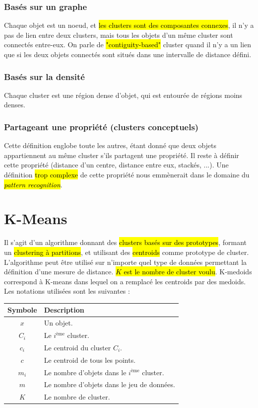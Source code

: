 \documentclass[letterpaper, 12pt]{article}
\newcommand{\alinea}{
\hspace*{0.5cm}}
\begin{document}
			\subsubsection{Basés sur un graphe}
				\alinea Chaque objet est un noeud, et \hl{les clusters sont
					des composantes connexes}, il n'y a pas de lien
					entre deux clusters, mais tous les objets d'un
					même cluster sont connectés entre-eux. On parle 
					de \hl{"contiguity-based"} cluster quand il n'y a un lien
					que si les deux objets connectés sont situés dans une
					intervalle de distance défini.
			\subsubsection{Basés sur la densité}
				\alinea Chaque cluster est une région dense d'objet, 
					qui est entourée de régions moins denses.
			\subsubsection{Partageant une propriété (clusters conceptuels)}
				\alinea Cette définition englobe toute les autres, étant
					donné que deux objets appartiennent au même cluster
					s'ils partagent une propriété. Il reste à définir
					cette propriété (distance d'un centre, distance
					entre eux, stackés, ...). Une définition \hl{trop complexe}
					de cette propriété nous emmènerait dans le domaine
					du \textit{\hl{pattern recognition}}.
	\newpage
	\section{K-Means}
		\alinea Il s'agit d'un algorithme donnant des \hl{clusters basés
			sur des prototypes}, formant un \hl{clustering à partitions},
			et utilisant des \hl{centroids} comme prototype de cluster. 
			L'algorithme peut être utilisé sur n'importe quel type de données
			permettant la définition d'une mesure de distance. 
			\hl{$K$ est le nombre de cluster voulu}. K-medoids correspond
			à K-means dans lequel on a remplacé les centroids par des
			medoids.\\
		\alinea Les notations utilisées sont les suivantes :\\
		\begin{center}
			\begin{tabular}{|c|l|}
				\hline
				Symbole & Description\\
				\hline
				$x$ & Un objet.\\
				$C_i$ & Le $i^{\text{ème}}$ cluster.\\
				$c_i$ & Le centroid du cluster $C_i$.\\
				$c$ & Le centroid de tous les points.\\
				$m_i$ & Le nombre d'objets dans le $i^{\text{ème}}$ cluster.\\
				$m$ & Le nombre d'objets dans le jeu de données.\\
				$K$ & Le nombre de cluster.\\
				\hline			
			\end{tabular}
		\end{center}
\end{document}
